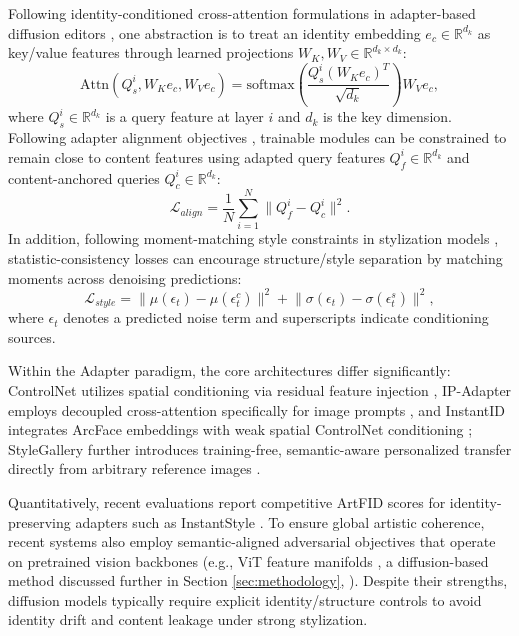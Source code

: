 \documentclass[journal]{IEEEtran}
\begin{document}
Following identity-conditioned cross-attention formulations in adapter-based diffusion editors \cite{ye2023ipadapter,wang2024instantid}, one abstraction is to treat an identity embedding $e_c \in \mathbb{R}^{d_k}$ as key/value features through learned projections $W_K, W_V \in \mathbb{R}^{d_k \times d_k}$:
\begin{equation}
  \mathrm{Attn}(Q_s^i, W_K e_c, W_V e_c) =
  \mathrm{softmax}\left(\frac{Q_s^i (W_K e_c)^T}{\sqrt{d_k}}\right) W_V e_c,
\end{equation}
where $Q_s^i \in \mathbb{R}^{d_k}$ is a query feature at layer $i$ and $d_k$ is the key dimension. Following adapter alignment objectives \cite{zhang2023adding,wang2024instantid}, trainable modules can be constrained to remain close to content features using adapted query features $Q_f^i \in \mathbb{R}^{d_k}$ and content-anchored queries $Q_c^i \in \mathbb{R}^{d_k}$:
\begin{equation}
  \mathcal{L}_{align} = \frac{1}{N} \sum_{i=1}^{N} \lVert Q_f^i - Q_c^i \rVert^2.
\end{equation} In addition, following moment-matching style constraints in stylization models \cite{gatys2016image,huang2017arbitraryst}, statistic-consistency losses can encourage structure/style separation by matching moments across denoising predictions:
\begin{equation}
  \mathcal{L}_{style} =
  \lVert \mu(\epsilon_t) - \mu(\epsilon_t^c) \rVert^2
  + \lVert \sigma(\epsilon_t) - \sigma(\epsilon_t^s) \rVert^2,
\end{equation}
where $\epsilon_t$ denotes a predicted noise term and superscripts indicate conditioning sources.

Within the Adapter paradigm, the core architectures differ significantly: ControlNet utilizes spatial conditioning via residual feature injection \cite{zhang2023adding}, IP-Adapter employs decoupled cross-attention specifically for image prompts \cite{ye2023ipadapter}, and InstantID integrates ArcFace embeddings with weak spatial ControlNet conditioning \cite{wang2024instantid}; StyleGallery further introduces training-free, semantic-aware personalized transfer directly from arbitrary reference images \cite{he2026stylegallerytrainingfreesemanticawarepersonalized}.

Quantitatively, recent evaluations report competitive ArtFID scores for identity-preserving adapters such as InstantStyle \cite{wang2024instantstyle}. To ensure global artistic coherence, recent systems also employ semantic-aligned adversarial objectives that operate on pretrained vision backbones (e.g., ViT feature manifolds \cite{kwon2022diffuseit}, a diffusion-based method discussed further in Section \ref{sec:methodology}, \cite{cheng2023visual}). Despite their strengths, diffusion models typically require explicit identity/structure controls to avoid identity drift and content leakage under strong stylization.
\end{document}

